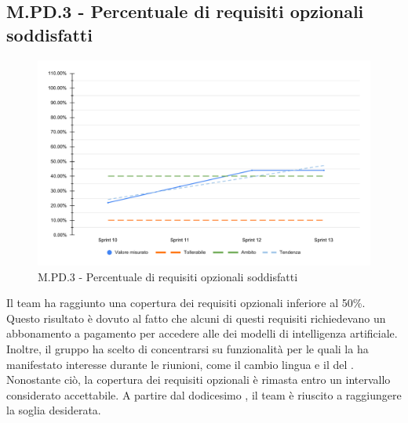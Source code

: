 \subsection{M.PD.3 - Percentuale di requisiti opzionali soddisfatti}

\begin{figure}[H]
    \centering
    \includegraphics[width=\textwidth]{assets/requisiti_opzionali_soddisfatti.pdf}
    \caption{M.PD.3 - Percentuale di requisiti opzionali soddisfatti}
\end{figure}

\par Il team ha raggiunto una copertura dei requisiti opzionali inferiore al 50\%. Questo risultato è dovuto al fatto che alcuni di questi requisiti richiedevano un abbonamento a pagamento per accedere alle  dei modelli di intelligenza artificiale. Inoltre, il gruppo ha scelto di concentrarsi su funzionalità per le quali la  ha manifestato interesse durante le riunioni, come il cambio lingua e il  del . Nonostante ciò, la copertura dei requisiti opzionali è rimasta entro un intervallo considerato accettabile. A partire dal dodicesimo , il team è riuscito a raggiungere la soglia desiderata.
